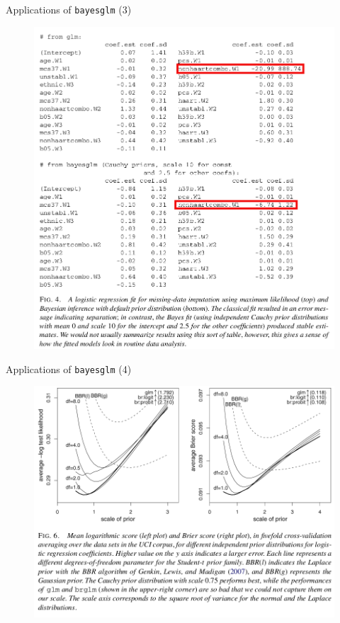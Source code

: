 \documentclass{beamer}
\begin{document}
\begin{frame}{Applications of \texttt{bayesglm} (3)}
	\begin{figure}
		\includegraphics[scale=0.24]{imgs/result3.png}
	\end{figure}
\end{frame}

\begin{frame}{Applications of \texttt{bayesglm} (4)}
	\begin{figure}
		\includegraphics[scale=0.24]{imgs/result4.png}
	\end{figure}
\end{frame}



	
\end{document}
